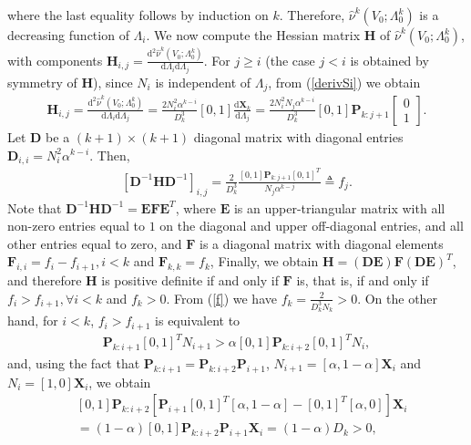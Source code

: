 \documentclass[10pt,twocolumn,twoside]{IEEEtran}
\theoremstyle{plain}
\begin{document}
where the last equality follows by induction on $k$. 
 Therefore, $\hat\nu^k(V_0;\Lambda_0^{k})$ is a decreasing function of $\Lambda_i$.
We now compute the Hessian matrix $\mathbf H$ of $\hat\nu^k(V_0;\Lambda_0^{k})$,  with components 
$\mathbf H_{i,j}=\frac{\mathrm d^2\hat\nu^k(V_0;\Lambda_0^{k})}{\mathrm d \Lambda_i\mathrm d \Lambda_j}$.
For $j\geq i$ (the case $j<i$ is obtained by symmetry of $\mathbf H$), since $N_i$ is independent of $\Lambda_j$,
from (\ref{derivSi})
 we obtain 
\begin{align*}
 \mathbf H_{i,j}
\!\!=\!\!\frac{\!\mathrm d^2\hat\nu^k(V_0\!;\!\Lambda_0^{k})\!}{\mathrm d \Lambda_i\mathrm d \Lambda_j}
\!\!=\!\!
\frac{\!2N_i^2\alpha^{k-i}\!\!\!\!\!\!\!\!}{ D_k^3}[0,\!1]\frac{\mathrm d\mathbf X_k}{\mathrm d\Lambda_j}
\!\!=\!\!
\frac{\!2N_i^2\!N_{j}\alpha^{k-i}\!\!\!\!\!\!\!\!}{ D_k^3}
[0,\!1]\mathbf P_{k:j+1}\!\!
\left[\begin{array}{c}\!\!\!0\!\!\!\\\!\!\!1\!\!\!\end{array}\right]\!\!.
\end{align*}
Let $\mathbf D$ be a $(k+1)\times(k+1)$ diagonal matrix with diagonal entries
$\mathbf D_{i,i}=N_i^2\alpha^{k-i}$. Then,
\begin{align}
\label{f}
[\mathbf D^{-1}\mathbf H\mathbf D^{-1}]_{i,j}
=
\frac{2}{ D_k^3}
\frac{[0,1]\mathbf P_{k:j+1}[0,1]^T}
{N_j\alpha^{k-j}}\triangleq f_j.
\end{align}
Note that $\mathbf D^{-1}\mathbf H\mathbf D^{-1}=
\mathbf E
\mathbf F\mathbf E^T
$, where $\mathbf E$ is an upper-triangular matrix
with all non-zero entries equal to $1$ on the diagonal and upper off-diagonal entries,  
and all other entries equal to zero, 
and $\mathbf F$ is a diagonal matrix with diagonal elements $\mathbf F_{i,i}=f_i-f_{i+1},i<k$ and $\mathbf F_{k,k}=f_k$, 
Finally, we obtain
$\mathbf H=
(\mathbf D\mathbf E)
\mathbf F(\mathbf D\mathbf E)^T$,
and therefore $\mathbf H$ is positive definite if and only if 
$\mathbf F$ is, that is, 
if and only if 
$f_i>f_{i+1},\forall i<k$ and $f_k>0$. 
From (\ref{f}) we have $f_k=\frac{2}{ D_k^3N_k}>0$.
On the other hand, for $i<k$,
$f_i>f_{i+1}$ is equivalent to
\begin{align}
[0,1]\mathbf P_{k:i+1}[0,1]^T
N_{i+1}
>
\alpha
[0,1]\mathbf P_{k:i+2}[0,1]^T
N_i,
\end{align}
and,
using the fact that $\mathbf P_{k:i+1}
=\mathbf P_{k:i+2}\mathbf P_{i+1}$,
$N_{i+1}=[\alpha,1-\alpha]\mathbf X_i$ and 
$N_{i}=[1,0]\mathbf X_i$,
we obtain
\begin{align}
&[0,1]\mathbf P_{k:i+2}
\left[\mathbf P_{i+1}[0,1]^T[\alpha,1-\alpha]
-[0,1]^T[\alpha,0]\right]
\mathbf X_i
\nonumber\\&
=
(1-\alpha)[0,1]\mathbf P_{k:i+2}
\mathbf P_{i+1}\mathbf X_i
=
(1-\alpha) D_k
>
0,
\end{align}
\end{document}
